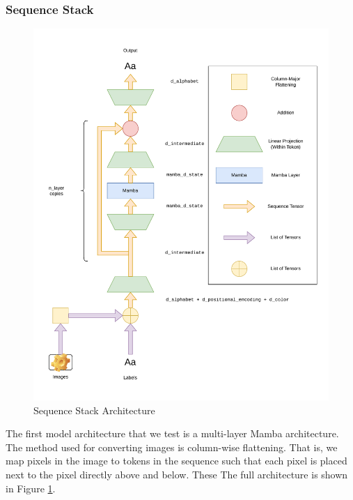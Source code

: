 \subsubsection{Sequence Stack}
\begin{figure}[ht]
    \includegraphics[width=\textwidth]{figures/sequence_stack.pdf}
    \caption{Sequence Stack Architecture}
    \label{sequencestack}
\end{figure}
The first model architecture that we test is a multi-layer Mamba architecture.
The method used for converting images is column-wise flattening. That is, we map
pixels in the image to tokens in the sequence such that each pixel is placed
next to the pixel directly above and below.
These 
The full architecture is shown in Figure \ref{sequencestack}.

